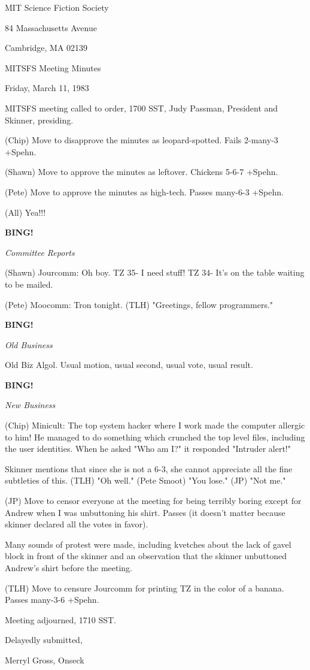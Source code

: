 \documentclass[12pt]{article}
\newcommand{\bing}{{\bf BING!} }
\newcommand{\goto}[1]{\bing \vskip 12pt \centerline{{\em{#1}}}}
\begin{document}
\begin{center}

MIT Science Fiction Society 

84 Massachusetts Avenue

Cambridge, MA 02139

\vspace{12pt}

MITSFS Meeting Minutes 

Friday, March 11, 1983

\end{center}
 
\vspace{18pt}

\setlength{\parskip}{6pt}

\noindent
MITSFS meeting called to order, 1700 SST,
Judy Passman, President and Skinner, presiding.

(Chip) Move to disapprove the minutes as leopard-spotted. Fails 2-many-3 +Spehn.

(Shawn) Move to approve the minutes as leftover. Chickens 5-6-7 +Spehn.

(Pete) Move to approve the minutes as high-tech. Passes many-6-3 +Spehn.

(All) Yea!!!

\goto{Committee Reports}

(Shawn) Jourcomm: Oh boy. TZ 35- I need stuff! TZ 34- It's on the table waiting to be mailed.

(Pete) Moocomm: Tron tonight. (TLH) "Greetings, fellow programmers."

\goto{Old Business}

Old Biz Algol. Usual motion, usual second, usual vote, usual result.

\goto{New Business}

(Chip) Minicult: The top system hacker where I work made the computer allergic to him! He managed to do something which crunched the top level files, including the user identities. When he asked "Who am I?" it responded "Intruder alert!"

Skinner mentions that since she is not a 6-3, she cannot appreciate all the fine subtleties of this. (TLH) "Oh well." (Pete Smoot) "You lose." (JP) "Not me."

(JP) Move to censor everyone at the meeting for being terribly boring except for Andrew when I was unbuttoning his shirt. Passes (it doesn't matter because skinner declared all the votes in favor).

Many sounds of protest were made, including kvetches about the lack of gavel block in front of the skinner and an observation that the skinner unbuttoned Andrew's shirt before the meeting.

(TLH) Move to censure Jourcomm for printing TZ in the color of a banana. Passes many-3-6 +Spehn.

\vspace{12pt}

\noindent
Meeting adjourned, 1710 SST.

\vspace{18pt}

\centerline{Delayedly submitted,}
\centerline{Merryl Gross, Onseck}
\end{document}
